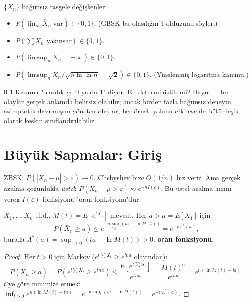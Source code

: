 \begin{ornek}
$\{X_n\}$ bağımsız rasgele değişkenler:
\begin{itemize}
  \item $P(\lim_n \bar{X}_n \text{ var}) \in \{0,1\}$. (GBSK bu olasılığın 1 olduğunu söyler.)
  \item $P(\sum X_n \text{ yakınsar}) \in \{0,1\}$.
  \item $P(\limsup_n X_n = +\infty) \in \{0,1\}$.
  \item $P(\limsup_n X_n/\sqrt{n\ln\ln n} = \sqrt{2}) \in \{0,1\}$. (Yinelenmiş logaritma kanunu.)
\end{itemize}
\end{ornek}

\begin{kritiksorgu}
0-1 Kanunu "olasılık ya 0 ya da 1" diyor. Bu deterministik mi?
Hayır --- bu olaylar gerçek anlamda belirsiz olabilir; ancak birden fazla bağımsız
deneyin asimptotik davranışını yöneten olaylar, her örnek yolunu etkilese de
bütünleşik olarak keskin sınıflandırılabilir.
\end{kritiksorgu}

\section{Büyük Sapmalar: Giriş}
\label{sec:buyuk_sapmalar}

\begin{motivasyon}
ZBSK: $P(|\bar{X}_n - \mu| > \varepsilon) \to 0$. Chebyshev bize $O(1/n)$ hız verir.
Ama gerçek azalma çoğunlukla \emph{üstel}: $P(\bar{X}_n - \mu > \varepsilon) \approx e^{-nI(\varepsilon)}$.
Bu üstel azalma hızını veren $I(\varepsilon)$ fonksiyonu "oran fonksiyonu"dur.
\end{motivasyon}

\begin{teorem}
\label{thm:chernoff}
$X_1, \ldots, X_n$ i.i.d., $M(t) = E[e^{tX_1}]$ mevcut. Her $a > \mu = E[X_1]$ için
\[
  P(\bar{X}_n \geq a) \leq e^{-n \sup_{t \geq 0}(ta - \ln M(t))} = e^{-n \Lambda^*(a)},
\]
burada $\Lambda^*(a) = \sup_{t \geq 0}(ta - \ln M(t)) > 0$: \textbf{oran fonksiyonu}.
\end{teorem}

\begin{proof}
Her $t > 0$ için Markov ($e^{t\sum X_i} \geq e^{tna}$ olayından):
\[
  P(\bar{X}_n \geq a) = P\!\left(e^{t\sum X_i} \geq e^{tna}\right)
  \leq \frac{E[e^{t\sum X_i}]}{e^{tna}} = \frac{M(t)^n}{e^{tna}} = e^{n(\ln M(t) - ta)}.
\]
$t$'ye göre minimize etmek: $\inf_{t>0} e^{n(\ln M(t)-ta)} = e^{-n\sup_t(ta - \ln M(t))} = e^{-n\Lambda^*(a)}$.
\end{proof}

